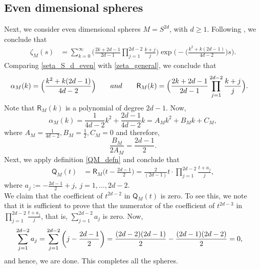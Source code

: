 \documentclass[11pt,lettersize,reqno,fullpage]{amsart}
\providecommand \hf{\hspace*{0.5cm}}
\begin{document}
\subsection{Even dimensional spheres}
 Next, we consider even dimensional spheres $M=S^{2d}$, with $d\geq 1$.  
Following 
\cite[page 8, theorem 3.2]{Cahn}, we conclude that 
\begin{align}
\zeta_{M}(s) & = \sum_{k=0}^{\infty} \Big(\frac{2k+2d-1}{2d-1}\prod_{j=1}^{2d-2} \frac{k+j}{j}\Big) 
\exp\Big(-\Big(\frac{k^2+k(2d-1)}{4d-2}\Big)s\Big). \label{seta_S_d_even}
\end{align}
Comparing \eqref{seta_S_d_even} with \eqref{zeta_general}, we conclude that 
\begin{align}
\alpha_{M}(k)& = \Big(\frac{k^2+k(2d-1)}{4d-2}\Big) \qquad \textnormal{and} \qquad 
\mathsf{R}_{M}(k) = 
\Big(\frac{2k+2d-1}{2d-1}\prod_{j=1}^{2d-2} \frac{k+j}{j}\Big).
\end{align}
Note that $\mathsf{R}_{M}(k)$ is a polynomial of degree $2d-1$.  Now, 
\[\alpha_{M}(k)=\frac{1}{4d-2}k^{2}+\frac{2d-1}{4d-2}k=A_{M}k^{2}+B_{M}k+C_{M}, \]
where $A_{M}=\frac{1}{4d-2}, B_{M}=\frac{1}{2}, C_{M}=0 $ and therefore, 
\[\frac{B_{M}}{2 A_{M}}=\frac{2d-1}{2}. \] 
Next, we apply definition \eqref{QM_defn} and conclude that 
\begin{align}
\mathsf{Q}_{M}(t) & = \mathsf{R}_{M}\Big(t-\frac{2d-1}{2}\Big)= \frac{2}{(2d-1)}t \cdot \prod_{j=1}^{2d-2} \frac{t+a_{j}}{j},
\end{align}
where $a_{j}:=-\frac{2d-1}{2}+j,\ j=1,\dots,2d-2 $. \\
\hf \hf We claim that the coefficient of $t^{2d-2} $ in $\mathsf{Q}_{M}(t)$ is zero. To see this, we note that it is sufficient to prove that the numerator of the coefficient of $t^{2d-3} $ in $ \prod_{j=1}^{2d-2} \frac{t+a_{j}}{j} $, that is, $\sum_{j=1}^{2d-2} a_{j} $ is zero. Now,
\begin{equation}
\begin{aligned}
\sum_{j=1}^{2d-2} a_{j}&=\sum_{j=1}^{2d-2} \left(j-\frac{2d-1}{2} \right)=\frac{(2d-2)(2d-1)}{2}-\frac{(2d-1)(2d-2)}{2}=0,
\end{aligned}
\notag
\end{equation}
and hence, we are done. This completes all the spheres. 
%
%
\end{document}
